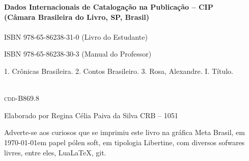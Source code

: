 \pagebreak

\ifodd\thepage\blankpage\fi

\parindent=0pt
\footnotesize\thispagestyle{empty}

\noindent\textbf{Dados Internacionais de Catalogação na Publicação -- CIP}\\
\noindent\textbf{(Câmara Brasileira do Livro, SP, Brasil)}\\

\dotfill\\

\hspace{20pt}ISBN 978-65-86238-31-0 (Livro do Estudante)

\hspace{20pt}ISBN 978-65-86238-30-3 (Manual do Professor)\\[6pt]

\hspace{20pt}\parbox{190pt}{1. Crônicas Brasileira. 2. Contos Brasileiro. 3. Rosa, Alexandre. I. Título.}\\[6pt]

\hspace{188pt}\textsc{cdd}-B869.8

\dotfill

\noindent{}Elaborado por Regina Célia Paiva da Silva CRB -- 1051\\
\mbox{}\vfill


\begin{center}
		\begin{minipage}{.7\textwidth}\noindent{}
		\centering\tiny
		Adverte-se aos curiosos que se imprimiu este 
		livro na gráfica Meta Brasil, 
		em \today em papel pólen soft, em tipologia Libertine, 
		com diversos sofwares livres, 
		entre eles, Lua\LaTeX, git.\\ 
		\medskip\\\
		\end{minipage}
\end{center}